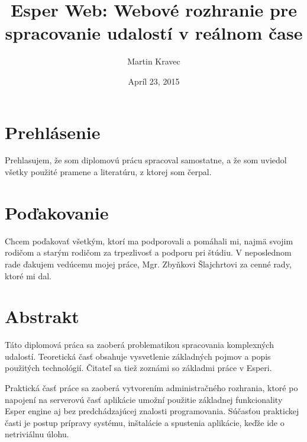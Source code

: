 \documentclass[12pt, a4paper, oneside]{book} %
\begin{document}
\title{Esper Web: Webové rozhranie pre spracovanie udalostí v reálnom čase}

\author{Martin Kravec}
\date{Apríl 23, 2015}

\frontmatter

\maketitle \thispagestyle{empty} \emptydoublepage

\chapter*{Prehlásenie}
Prehlasujem, že som diplomovú prácu spracoval samostatne, a že som uviedol všetky použité pramene a literatúru, z ktorej som čerpal.

\emptydoublepage

\chapter*{Poďakovanie}
Chcem poďakovať všetkým, ktorí ma podporovali a pomáhali mi, najmä svojim rodičom a starým rodičom za trpezlivosť a podporu pri štúdiu. V neposlednom rade ďakujem vedúcemu mojej práce, Mgr. Zbyňkovi Šlajchrtovi za cenné rady, ktoré mi dal.

\emptydoublepage


\chapter*{Abstrakt}
Táto diplomová práca sa zaoberá problematikou spracovania komplexných udalostí. Teoretická časť obsahuje vysvetlenie základných pojmov a popis použitých technológií. Čitateľ sa tiež zoznámi so základmi práce v Esperi.

Praktická časť práce sa zaoberá vytvorením administračného rozhrania, ktoré po napojení na serverovú časť aplikácie umožní použitie základnej funkcionality Esper engine aj bez predchádzajúcej znalosti programovania. Súčasťou praktickej časti je postup prípravy systému, inštalácie a spustenia aplikácie, keďže ide o netriviálnu úlohu.
\end{document}
